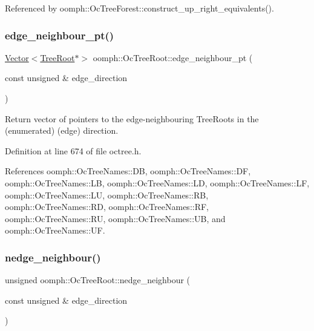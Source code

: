 Referenced by oomph\+::\+Oc\+Tree\+Forest\+::construct\+\_\+up\+\_\+right\+\_\+equivalents().

\mbox{\label{classoomph_1_1OcTreeRoot_acef513b8401e5fd32d1311bdebe86f45}} 
\subsubsection{\texorpdfstring{edge\+\_\+neighbour\+\_\+pt()}{edge\_neighbour\_pt()}}
{\footnotesize\ttfamily \hyperlink{classoomph_1_1Vector}{Vector}$<$\hyperlink{classoomph_1_1TreeRoot}{Tree\+Root}$\ast$$>$ oomph\+::\+Oc\+Tree\+Root\+::edge\+\_\+neighbour\+\_\+pt (\begin{DoxyParamCaption}\item[{const unsigned \&}]{edge\+\_\+direction }\end{DoxyParamCaption})\hspace{0.3cm}{\ttfamily [inline]}}



Return vector of pointers to the edge-\/neighbouring Tree\+Roots in the (enumerated) (edge) direction. 



Definition at line 674 of file octree.\+h.



References oomph\+::\+Oc\+Tree\+Names\+::\+DB, oomph\+::\+Oc\+Tree\+Names\+::\+DF, oomph\+::\+Oc\+Tree\+Names\+::\+LB, oomph\+::\+Oc\+Tree\+Names\+::\+LD, oomph\+::\+Oc\+Tree\+Names\+::\+LF, oomph\+::\+Oc\+Tree\+Names\+::\+LU, oomph\+::\+Oc\+Tree\+Names\+::\+RB, oomph\+::\+Oc\+Tree\+Names\+::\+RD, oomph\+::\+Oc\+Tree\+Names\+::\+RF, oomph\+::\+Oc\+Tree\+Names\+::\+RU, oomph\+::\+Oc\+Tree\+Names\+::\+UB, and oomph\+::\+Oc\+Tree\+Names\+::\+UF.

\mbox{\label{classoomph_1_1OcTreeRoot_add3c1de4903d2db75d19274719912ea3}} 
\subsubsection{\texorpdfstring{nedge\+\_\+neighbour()}{nedge\_neighbour()}}
{\footnotesize\ttfamily unsigned oomph\+::\+Oc\+Tree\+Root\+::nedge\+\_\+neighbour (\begin{DoxyParamCaption}\item[{const unsigned \&}]{edge\+\_\+direction }\end{DoxyParamCaption})\hspace{0.3cm}{\ttfamily [inline]}}




